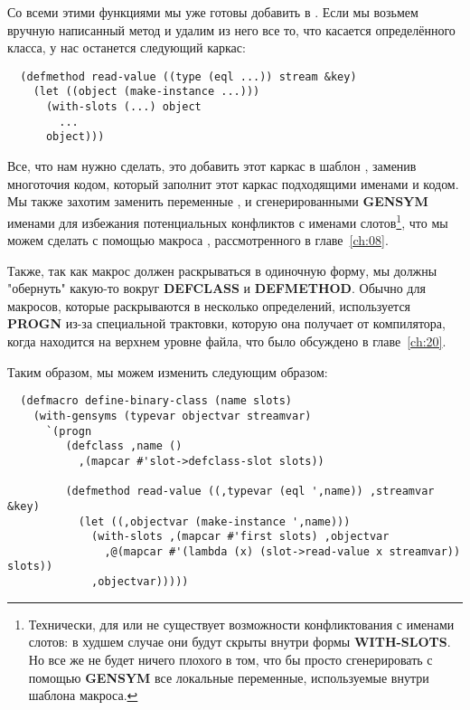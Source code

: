 Со всеми этими функциями мы уже готовы добавить  в
. Если мы возьмем вручную написанный метод  и
удалим из него все то, что касается определённого класса, у нас останется следующий
каркас:

\begin{lstlisting}
  (defmethod read-value ((type (eql ...)) stream &key)
    (let ((object (make-instance ...)))
      (with-slots (...) object
        ...
      object)))
\end{lstlisting}

Все, что нам нужно сделать, это добавить этот каркас в шаблон ,
заменив многоточия кодом, который заполнит этот каркас подходящими именами и кодом. Мы
также захотим заменить переменные ,  и 
сгенерированными \textbf{GENSYM} именами для избежания потенциальных конфликтов с именами
слотов\footnote{Технически, для  или  не существует возможности
  конфликтования с именами слотов: в худшем случае они будут скрыты внутри формы
  \textbf{WITH-SLOTS}. Но все же не будет ничего плохого в том, что бы просто
  сгенерировать с помощью \textbf{GENSYM} все локальные переменные, используемые внутри
  шаблона макроса.}, что мы можем сделать с помощью макроса ,
рассмотренного в главе~\ref{ch:08}.

Также, так как макрос должен раскрываться в одиночную форму, мы должны "обернуть" какую-то
вокруг \textbf{DEFCLASS} и \textbf{DEFMETHOD}. Обычно для макросов, которые раскрываются в
несколько определений, используется \textbf{PROGN} из-за специальной трактовки, которую
она получает от компилятора, когда находится на верхнем уровне файла, что было обсуждено в
главе~\ref{ch:20}.

Таким образом, мы можем изменить  следующим образом:

\begin{lstlisting}
  (defmacro define-binary-class (name slots)
    (with-gensyms (typevar objectvar streamvar)
      `(progn
         (defclass ,name ()
           ,(mapcar #'slot->defclass-slot slots))

         (defmethod read-value ((,typevar (eql ',name)) ,streamvar &key)
           (let ((,objectvar (make-instance ',name)))
             (with-slots ,(mapcar #'first slots) ,objectvar
               ,@(mapcar #'(lambda (x) (slot->read-value x streamvar)) slots))
             ,objectvar)))))
\end{lstlisting}

